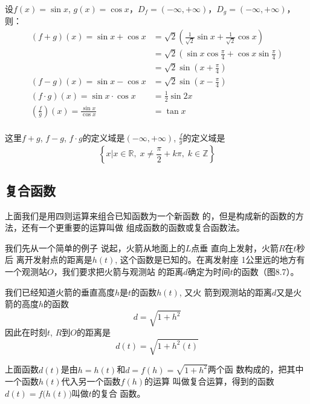 \begin{example}
设$f(x)=\sin x$, $g(x)=\cos x$，$D_f=(-\infty,+\infty)$，$D_g=(-\infty,+\infty)$，则：
\[\begin{split}
    (f+g)(x)=\sin x+\cos x&=\sqrt{2}\left(\frac{1}{\sqrt{2}}\sin x+\frac{1}{\sqrt{2}}\cos x\right)\\
    &=\sqrt{2}\left(\sin x\cos\frac{\pi}{4}+\cos x\sin\frac{\pi}{4} \right)\\
    &=\sqrt{2}\sin\left(x+\frac{\pi}{4}\right)\\
    (f-g)(x)=\sin x-\cos x&=\sqrt{2}\sin\left(x-\frac{\pi}{4}\right)\\
    (f\cdot g)(x)=\sin x\cdot \cos x&=\frac{1}{2}\sin 2x\\
    \left(\frac{f}{g}\right)(x)=\frac{\sin x}{\cos x}&=\tan x\\
\end{split}\]    

这里$f+g$, $f-g$, $f\cdot g$的定义域是$(-\infty,+\infty)$, $\frac{f}{g}$的定义域是$$\left\{x\big|x\in\mathbb{R},\; x\ne \frac{\pi}{2}+k\pi,\; k\in \mathbb{Z}\right\}$$
\end{example}

\subsection{复合函数}
上面我们是用四则运算来组合已知函数为一个新函数
的，但是构成新的函数的方法，还有一个更重要的运算叫做
组成函数的函数或复合函数法。

我们先从一个简单的例子
说起，火箭从地面上的$L$点垂
直向上发射，火箭$R$在$t$秒后
离开发射点的距离是$h(t)$, 这个函数是已知的。在离发射座
1公里远的地方有一个观测站$O$，我们要求把火箭与观测站
的距离$d$确定为时间$t$的函数（图8.7）。
\begin{figure}[htp]
    \centering
{}
    \caption{}
\end{figure}

我们已经知道火箭的垂直高度$h$是$t$的函数$h(t)$, 又火
箭到观测站的距离$d$又是火箭的高度$h$的函数
\[d=\sqrt{1+h^2}\]
因此在时刻$t$, $R$到$O$的距离是
\[d(t)=\sqrt{1+h^2(t)}\]

上面函数$d(t)$是由$h=h(t)$和$d=f(h)=\sqrt{1+h^2}$两个函
数构成的，把其中一个函数$h(t)$代入另一个函数$f(h)$的运算
叫做复合运算，得到的函数$d(t)=f\big(h(t)\big)$叫做$t$的复合
函数。


